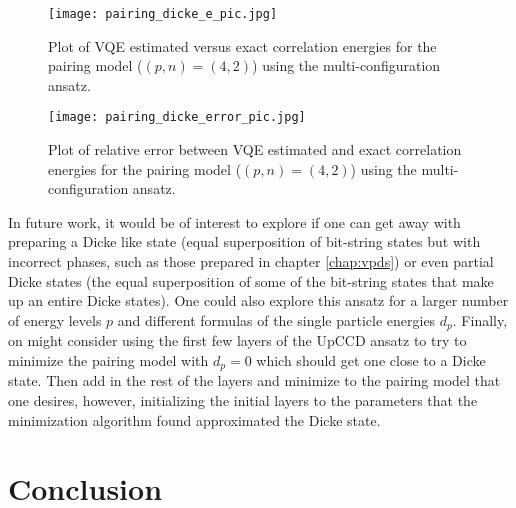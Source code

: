 \documentclass[10pt]{article}
\begin{document}
\begin{figure}
    \centering
    \texttt{[image: pairing\_dicke\_e\_pic.jpg]}
    \caption{Plot of VQE estimated versus exact correlation energies for the pairing model ($(p,n)=(4,2)$) using the multi-configuration ansatz.}
    \label{fig:pairing_dicke_e_pic}
\end{figure}

\begin{figure}
    \centering
    \texttt{[image: pairing\_dicke\_error\_pic.jpg]}
    \caption{Plot of relative error between VQE estimated and exact correlation energies for the pairing model ($(p,n)=(4,2)$) using the multi-configuration ansatz.}
    \label{fig:pairing_dicke_error_pic}
\end{figure}

In future work, it would be of interest to explore if one can get away with preparing a Dicke like state (equal superposition of bit-string states but with incorrect phases, such as those prepared in chapter \ref{chap:vpds}) or even partial Dicke states (the equal superposition of some of the bit-string states that make up an entire Dicke states). One could also explore this ansatz for a larger number of energy levels $p$ and different formulas of the single particle energies $d_p$. Finally, on might consider using the first few layers of the UpCCD ansatz to try to minimize the pairing model with $d_p=0$ which should get one close to a Dicke state. Then add in the rest of the layers and minimize to the pairing model that one desires, however, initializing the initial layers to the parameters that the minimization algorithm found approximated the Dicke state. 

\section{Conclusion}
\end{document}
